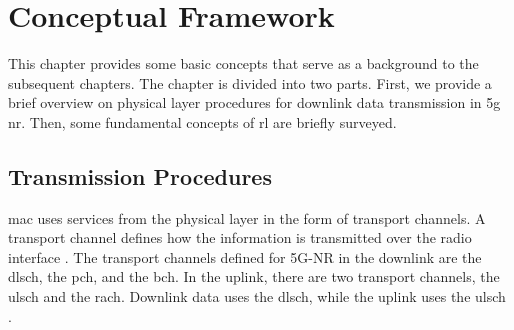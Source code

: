 \glsresetall[\acronymtype]
%
\chapter{Conceptual Framework}%
\label{chp:theory}

This chapter provides some basic concepts that serve as a background to the subsequent chapters.
%
The chapter is divided into two parts.
%
First, we provide a brief overview on physical layer procedures for downlink data transmission in \gls{5g} \gls{nr}.
%
Then, some fundamental concepts of \gls{rl} are briefly surveyed.
%

\section{Transmission Procedures}
\label{sec:5gnr-trans}
\Gls{mac} uses services from the physical layer in the form of transport channels.
%
A transport channel defines how the information is transmitted over the radio interface \cite{3gpp.38.212} \cite{ErikDahlman5G}.
%
The transport channels defined for 5G-NR in the downlink are the \gls{dlsch}, the \gls{pch}, and the \gls{bch}.
%
In the uplink, there are two transport channels, the \gls{ulsch} and the \gls{rach}.
%
Downlink data uses the \gls{dlsch}, while the uplink uses the \gls{ulsch} \cite{AliZaidi632018}.
%

